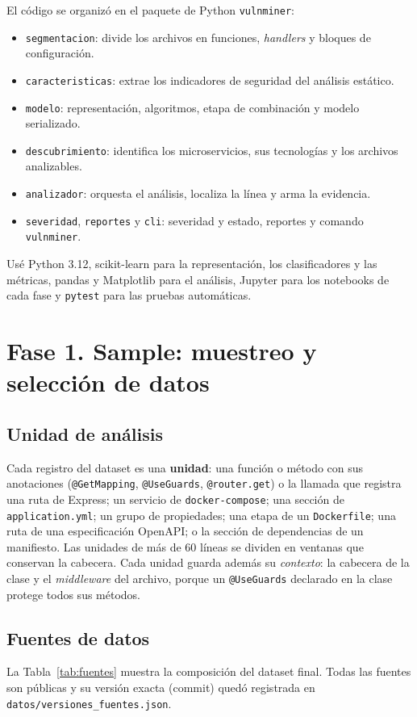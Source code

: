 \documentclass[12pt,a4paper]{article}
\newcommand{\ruta}[1]{\nolinkurl{#1}}
\newcommand{\cod}[1]{\texttt{#1}}
\begin{document}
El código se organizó en el paquete de Python \cod{vulnminer}:
\begin{itemize}
  \item \cod{segmentacion}: divide los archivos en funciones, \emph{handlers} y bloques de configuración.
  \item \cod{caracteristicas}: extrae los indicadores de seguridad del análisis estático.
  \item \cod{modelo}: representación, algoritmos, etapa de combinación y modelo serializado.
  \item \cod{descubrimiento}: identifica los microservicios, sus tecnologías y los archivos analizables.
  \item \cod{analizador}: orquesta el análisis, localiza la línea y arma la evidencia.
  \item \cod{severidad}, \cod{reportes} y \cod{cli}: severidad y estado, reportes y comando \cod{vulnminer}.
\end{itemize}
Usé Python 3.12, scikit-learn \cite{sklearn} para la representación, los clasificadores y las métricas, pandas y Matplotlib para el análisis, Jupyter para los notebooks de cada fase y \cod{pytest} para las pruebas automáticas.

\section{Fase 1. Sample: muestreo y selección de datos}

\subsection{Unidad de análisis}
Cada registro del dataset es una \textbf{unidad}: una función o método con sus anotaciones (\cod{@GetMapping}, \cod{@UseGuards}, \cod{@router.get}) o la llamada que registra una ruta de Express; un servicio de \cod{docker-compose}; una sección de \cod{application.yml}; un grupo de propiedades; una etapa de un \cod{Dockerfile}; una ruta de una especificación OpenAPI; o la sección de dependencias de un manifiesto. Las unidades de más de 60 líneas se dividen en ventanas que conservan la cabecera. Cada unidad guarda además su \emph{contexto}: la cabecera de la clase y el \emph{middleware} del archivo, porque un \cod{@UseGuards} declarado en la clase protege todos sus métodos.

\subsection{Fuentes de datos}
La Tabla~\ref{tab:fuentes} muestra la composición del dataset final. Todas las fuentes son públicas y su versión exacta (commit) quedó registrada en \ruta{datos/versiones_fuentes.json}.
\end{document}
